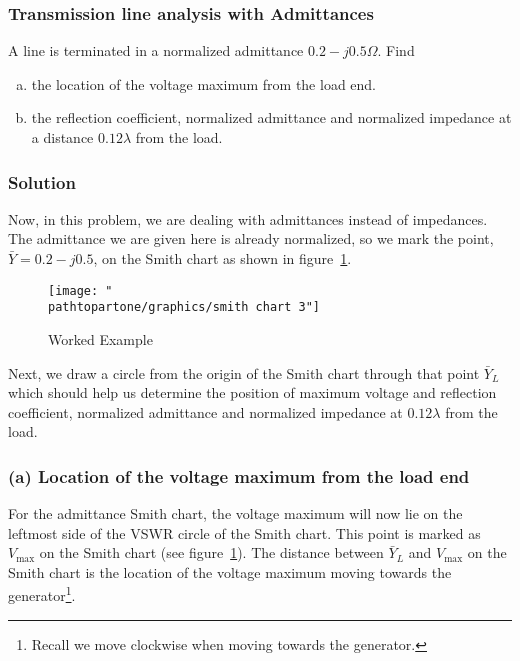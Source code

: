 \begin{exmp}
\subsubsection*{Transmission line analysis with Admittances}
A line is terminated in a normalized admittance $0.2-j0.5\varOmega$. Find 
\begin{enumerate}[(a)]
\item the location of the voltage maximum from the load end. 
\item the reflection coefficient, normalized admittance and normalized impedance at a distance $0.12\lambda$ from the load.
\end{enumerate}

\subsubsection*{Solution}
Now, in this problem, we are dealing with admittances instead of impedances. The admittance we are given here is already normalized, so we mark the point, $\bar{Y} = 0.2 - j0.5$, on the Smith chart as shown in figure~\ref{fig:workedexample3}.
\begin{figure}[h]
\centering
\texttt{[image: "\\pathtopartone/graphics/smith chart 3"]}
\caption{Worked Example}
\label{fig:workedexample3}
\end{figure}

Next, we draw a circle from the origin of the Smith chart through that point $\bar{Y}_L$ which should help us determine the position of maximum voltage and reflection coefficient, normalized admittance and normalized impedance at $0.12\lambda$ from the load.

\subsubsection*{(a) Location of the voltage maximum from the load end}
For the admittance Smith chart, the voltage maximum will now lie on the leftmost side of the VSWR circle of the Smith chart. This point is marked as $V_\max$ on the Smith chart (see figure~\ref{fig:workedexample3}). The distance between $\bar{Y}_L$ and $V_\max$ on the Smith chart is the location of the voltage maximum moving towards the generator\footnote{
Recall we move clockwise when moving towards the generator.
}.


\end{exmp}
